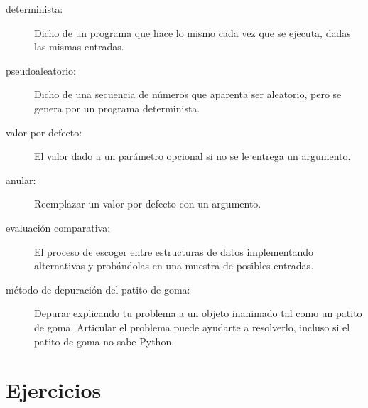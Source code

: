 \documentclass[10pt]{book}
\begin{document}
\begin{description}

\item[determinista:] Dicho de un programa que hace lo
mismo cada vez que se ejecuta, dadas las mismas entradas.

\item[pseudoaleatorio:] Dicho de una secuencia de números que aparenta
ser aleatorio, pero se genera por un programa determinista.

\item[valor por defecto:] El valor dado a un parámetro opcional si
no se le entrega un argumento.

\item[anular:] Reemplazar un valor por defecto con un argumento.

\item[evaluación comparativa:] El proceso de escoger entre estructuras de datos
implementando alternativas y probándolas en una muestra de
posibles entradas.

\item[método de depuración del patito de goma:] Depurar explicando tu problema
a un objeto inanimado tal como un patito de goma.  Articular el
problema puede ayudarte a resolverlo, incluso si el patito de goma no sabe
Python.

\end{description}


\section{Ejercicios}
\end{document}
